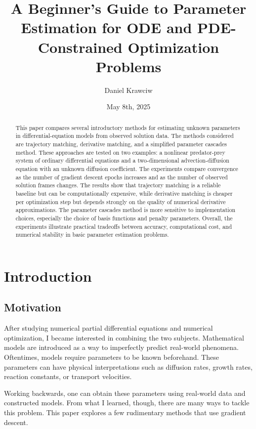 \documentclass{article}
\title{A Beginner's Guide to Parameter Estimation for ODE and PDE-Constrained Optimization Problems}
\author{Daniel Krawciw}
\date{May 8th, 2025}
\begin{document}
\maketitle

\begin{abstract}
This paper compares several introductory methods for estimating unknown parameters in differential-equation models from observed solution data. The methods considered are trajectory matching, derivative matching, and a simplified parameter cascades method. These approaches are tested on two examples: a nonlinear predator-prey system of ordinary differential equations and a two-dimensional advection-diffusion equation with an unknown diffusion coefficient. The experiments compare convergence as the number of gradient descent epochs increases and as the number of observed solution frames changes. The results show that trajectory matching is a reliable baseline but can be computationally expensive, while derivative matching is cheaper per optimization step but depends strongly on the quality of numerical derivative approximations. The parameter cascades method is more sensitive to implementation choices, especially the choice of basis functions and penalty parameters. Overall, the experiments illustrate practical tradeoffs between accuracy, computational cost, and numerical stability in basic parameter estimation problems.
\end{abstract}

\section{Introduction}
\FloatBarrier

\subsection{Motivation}

After studying numerical partial differential equations and numerical optimization, I became interested in combining the two subjects. Mathematical models are introduced as a way to imperfectly predict real-world phenomena. Oftentimes, models require parameters to be known beforehand. These parameters can have physical interpretations such as diffusion rates, growth rates, reaction constants, or transport velocities.

Working backwards, one can obtain these parameters using real-world data and constructed models. From what I learned, though, there are many ways to tackle this problem. This paper explores a few rudimentary methods that use gradient descent.
\end{document}

